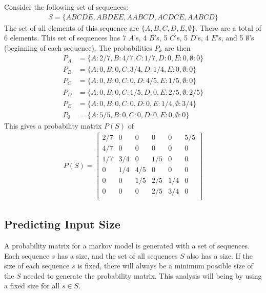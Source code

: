 Consider the following set of sequences:
\begin{align}
	S=\{ABCDE, ABDEE, AABCD, ACDCE, AABCD\}
\end{align}
The set of all elements of this sequence are $\{A, B, C, D, E, \emptyset\}$. There are a total of 6 elements. This set of sequences has 7 $A$'s, 4 $B$'s, 5 $C$'s, 5 $D$'s, 4 $E$'s, and 5 $\emptyset$'s (beginning of each sequence). The probabilities $P_k$ are then
\begin{align}
	P_A &= \{A:2/7, B:4/7, C:1/7, D:0, E:0, \emptyset:0 \} \\
	P_B &= \{A:0, B:0, C:3/4, D:1/4, E:0, \emptyset:0 \} \\
	P_C &= \{A:0, B:0, C:0, D:4/5, E:1/5, \emptyset:0 \} \\
	P_D &= \{A:0, B:0, C:1/5, D:0, E:2/5, \emptyset:2/5 \} \\
	P_E &= \{A:0, B:0, C:0, D:0, E:1/4, \emptyset:3/4 \} \\
	P_\emptyset &= \{A:5/5, B:0, C:0, D:0, E:0, \emptyset: 0\} 
\end{align}
This gives a probability matrix $P(S)$ of
\begin{align}
	P(S) = \left[\begin{matrix}
		2/7 & 0 & 0 & 0 & 0 & 5/5 \\
		4/7 & 0 & 0 & 0 & 0 &  0 \\
		1/7 & 3/4 & 0 & 1/5 & 0 & 0 \\
		0 & 1/4 & 4/5 & 0 & 0 & 0 \\
		0 & 0 & 1/5 & 2/5 & 1/4 & 0 \\
		0 & 0 & 0 & 2/5 & 3/4 & 0 \\
	\end{matrix}\right]
\end{align}










\subsection{Predicting Input Size}

A probability matrix for a markov model is generated with a set of sequences. Each sequence $s$ has a size, and the set of all sequences $S$ also has a size. If the size of each sequence $s$ is fixed, there will always be a minimum possible size of the $S$ needed to generate the probability matrix. This analysis will being by using a fixed size for all $s\in S$.

